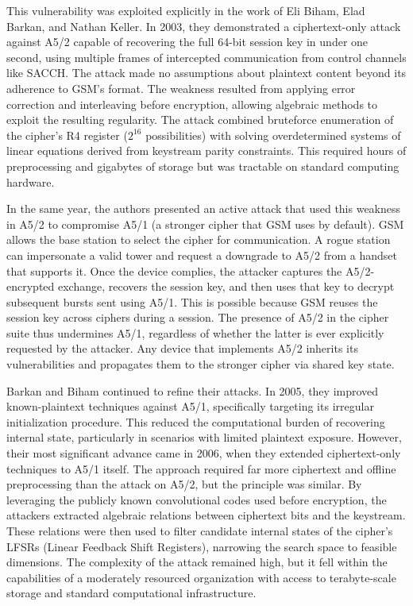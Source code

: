 This vulnerability was exploited explicitly in the work of Eli Biham, Elad Barkan, and Nathan Keller. In 2003, they demonstrated a ciphertext-only attack against A5/2 capable of recovering the full 64-bit session key in under one second, using multiple frames of intercepted communication from control channels like SACCH. The attack made no assumptions about plaintext content beyond its adherence to GSM’s format. The weakness resulted from applying error correction and interleaving before encryption, allowing algebraic methods to exploit the resulting regularity. The attack combined bruteforce enumeration of the cipher's R4 register ($2^{16}$ possibilities) with solving overdetermined systems of linear equations derived from keystream parity constraints. This required hours of preprocessing and gigabytes of storage but was tractable on standard computing hardware.

In the same year, the authors presented an active attack that used this weakness in A5/2 to compromise A5/1 (a stronger cipher that GSM uses by default). GSM allows the base station to select the cipher for communication. A rogue station can impersonate a valid tower and request a downgrade to A5/2 from a handset that supports it. Once the device complies, the attacker captures the A5/2-encrypted exchange, recovers the session key, and then uses that key to decrypt subsequent bursts sent using A5/1. This is possible because GSM reuses the session key across ciphers during a session. The presence of A5/2 in the cipher suite thus undermines A5/1, regardless of whether the latter is ever explicitly requested by the attacker. Any device that implements A5/2 inherits its vulnerabilities and propagates them to the stronger cipher via shared key state.

Barkan and Biham continued to refine their attacks. In 2005, they improved known-plaintext techniques against A5/1, specifically targeting its irregular initialization procedure. This reduced the computational burden of recovering internal state, particularly in scenarios with limited plaintext exposure. However, their most significant advance came in 2006, when they extended ciphertext-only techniques to A5/1 itself. The approach required far more ciphertext and offline preprocessing than the attack on A5/2, but the principle was similar. By leveraging the publicly known convolutional codes used before encryption, the attackers extracted algebraic relations between ciphertext bits and the keystream. These relations were then used to filter candidate internal states of the cipher’s LFSRs (Linear Feedback Shift Registers), narrowing the search space to feasible dimensions. The complexity of the attack remained high, but it fell within the capabilities of a moderately resourced organization with access to terabyte-scale storage and standard computational infrastructure.


